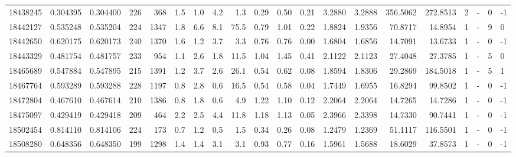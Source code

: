 \begin{tabular}{rrrrrrrrrrrrrrrrrlrl}
  18438245 & 0.304395 &   0.304400 &  226 &  368 &      1.5 &      1.0 &     4.2 &      1.3 &       0.29 &        0.50 &        0.21 &  3.2880 &  3.2888 &  356.5062 &  272.8513 &       2 &             - &        0 &        -1 \\
  18442127 & 0.535248 &   0.535204 &  224 & 1347 &      1.8 &      6.6 &     8.1 &     75.5 &       0.79 &        1.01 &        0.22 &  1.8824 &  1.9356 &   70.8717 &   14.8954 &       1 &             - &        9 &         0 \\
  18442650 & 0.620175 &   0.620173 &  240 & 1370 &      1.6 &      1.2 &     3.7 &      3.3 &       0.76 &        0.76 &        0.00 &  1.6804 &  1.6856 &   14.7091 &   13.6733 &       1 &             - &        0 &        -1 \\
  18443329 & 0.481754 &   0.481757 &  233 &  954 &      1.1 &      2.6 &     1.8 &     11.5 &       1.04 &        1.45 &        0.41 &  2.1122 &  2.1123 &   27.4048 &   27.3785 &       1 &             - &        5 &         0 \\
  18465689 & 0.547884 &   0.547895 &  215 & 1391 &      1.2 &      3.7 &     2.6 &     26.1 &       0.54 &        0.62 &        0.08 &  1.8594 &  1.8306 &   29.2869 &  184.5018 &       1 &             - &        5 &         1 \\
  18467764 & 0.593289 &   0.593288 &  228 & 1197 &      0.8 &      2.8 &     0.6 &     16.5 &       0.54 &        0.58 &        0.04 &  1.7449 &  1.6955 &   16.8294 &   99.8502 &       1 &             - &        0 &        -1 \\
  18472804 & 0.467610 &   0.467614 &  210 & 1386 &      0.8 &      1.8 &     0.6 &      4.9 &       1.22 &        1.10 &        0.12 &  2.2064 &  2.2064 &   14.7265 &   14.7286 &       1 &             - &        0 &        -1 \\
  18475097 & 0.429419 &   0.429418 &  209 &  464 &      2.2 &      2.5 &     4.4 &     11.8 &       1.18 &        1.13 &        0.05 &  2.3966 &  2.3398 &   14.7330 &   90.7441 &       1 &             - &        0 &        -1 \\
  18502454 & 0.814110 &   0.814106 &  224 &  173 &      0.7 &      1.2 &     0.5 &      1.5 &       0.34 &        0.26 &        0.08 &  1.2479 &  1.2369 &   51.1117 &  116.5501 &       1 &             - &        0 &        -1 \\
  18508280 & 0.648356 &   0.648350 &  199 & 1298 &      1.4 &      1.4 &     3.1 &      3.1 &       0.93 &        0.77 &        0.16 &  1.5961 &  1.5688 &   18.6029 &   37.8573 &       1 &             - &        0 &        -1 \\

\end{tabular}
